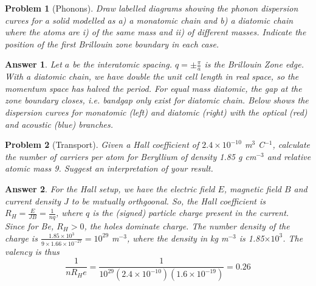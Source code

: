 \documentclass[a4paper]{article}
\newtheorem{ans}{Answer}[subsection]
\theoremstyle{new}
\newtheorem{qns}{Problem}[subsection]
\begin{document}
\begin{qns}[Phonons]
Draw labelled diagrams showing the phonon dispersion curves for a solid modelled as a) a monatomic chain and b) a diatomic chain where the atoms are i) of the same mass and ii) of different masses. Indicate the position of the first Brillouin zone boundary in each case.
\end{qns}
\begin{ans}
Let $a$ be the interatomic spacing. $q=\pm\frac{\pi}{a}$ is the Brillouin Zone edge. With a diatomic chain, we have double the unit cell length in real space, so the momentum space has halved the period. For equal mass diatomic, the gap at the zone boundary closes, i.e. bandgap only exist for diatomic chain. Below shows the dispersion curves for monatomic (left) and diatomic (right) with the optical (red) and acoustic (blue) branches.
\begin{center}
\hfill{}
\end{center}
\end{ans}
\begin{qns}[Transport]
Given a Hall coefficient of $2.4\times10^{-10}$ m$^3$ C$^{-1}$,  calculate the number of carriers per atom for Beryllium of density 1.85 g cm$^{-3}$ and relative atomic mass 9. Suggest an interpretation of your result.
\end{qns}
\begin{ans}
For the Hall setup, we have the electric field $E$, magnetic field $B$ and current density $J$ to be mutually orthgoonal. So, the Hall coefficient is $R_H=\frac{E}{JB}=\frac{1}{nq}$, where $q$ is the (signed) particle charge present in the current. Since for Be, $R_H>0$, the holes dominate charge. The number density of the charge is $\frac{1.85\times10^3}{9\times 1.66\times10^{-27}}=10^{29}$ m$^{-3}$, where the density in kg m$^{-3}$ is 1.85$\times10^3$. The valency is thus
$$\frac{1}{nR_He}=\frac{1}{10^{29}(2.4\times10^{-10})(1.6\times10^{-19})}=0.26$$
\end{ans}
\end{document}
